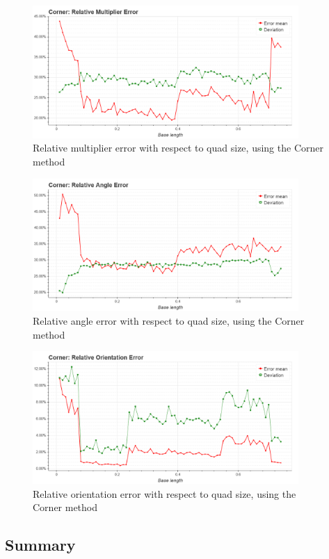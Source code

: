 \begin{figure}[ht]
	\centering
	\includegraphics[width=0.9\textwidth]{figures/plots/corner_relative_multiplier_error.png}
	\caption{Relative multiplier error with respect to quad size, using the Corner method}
	\label{fig:cornerRelMulErr}
\end{figure}

\begin{figure}[ht]
	\centering
	\includegraphics[width=0.9\textwidth]{figures/plots/corner_relative_angle_error.png}
	\caption{Relative angle error with respect to quad size, using the Corner method}
	\label{fig:cornerRelAngleErr}
\end{figure}

\begin{figure}[ht]
	\centering
	\includegraphics[width=0.9\textwidth]{figures/plots/corner_relative_orientation_error.png}
	\caption{Relative orientation error with respect to quad size, using the Corner method}
	\label{fig:cornerRelOrientErr}
\end{figure}

\clearpage

\subsection{Summary}
